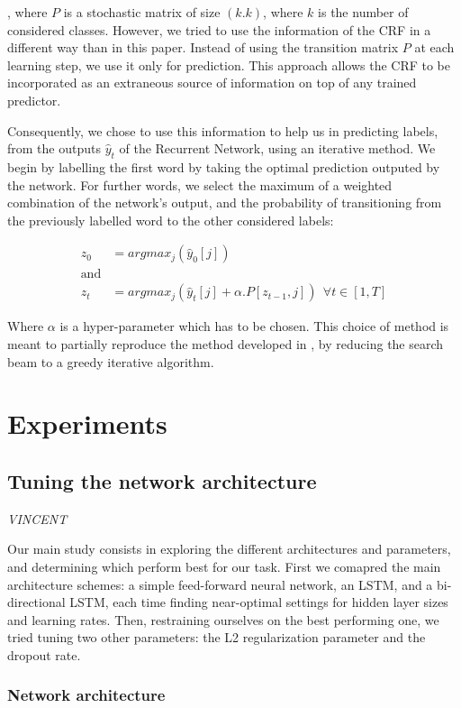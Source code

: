 \documentclass{article} %
\begin{document}
, where $P$ is a stochastic matrix of size $(k.k)$, where $k$ is the number of considered classes. However, we tried to use the information of the CRF in a different way than in this paper. Instead of using the transition matrix $P$ at each learning step, we use it only for prediction. This approach allows the CRF to be incorporated as an extraneous source of information on top of any trained predictor.

Consequently, we chose to use this information to help us in predicting labels, from the outputs $\hat{y}_t$ of the Recurrent Network, using an iterative method. We begin by labelling the first word by taking the optimal prediction outputed by the network. For further words, we select the maximum of a weighted combination of the network's output, and the probability of transitioning from the previously labelled word to the other considered labels:

\begin{align*}
z_0 &= argmax_j(\hat{y}_0[j])
\\
\text{and}&
\\
z_t &= argmax_j(\hat{y}_t[j] + \alpha.P[z_{t-1},  j]) \ \ \forall t \in [1, T]
\end{align*}


Where $\alpha$ is a hyper-parameter which has to be chosen. This
choice of method is meant to partially reproduce the method developed in \cite{lample2016neural}, by reducing the search beam to a greedy iterative algorithm.


\section{Experiments}

\subsection{Tuning the network architecture}
\textit{VINCENT}

Our main study consists in exploring the different architectures and parameters, and determining which perform best for our task. First we comapred the main architecture schemes: a simple feed-forward neural network, an LSTM, and a bi-directional LSTM, each time finding near-optimal settings for hidden layer sizes and learning rates. Then, restraining ourselves on the best performing one, we tried tuning two other parameters: the L2 regularization parameter and the dropout rate.

\subsubsection{Network architecture}
\end{document}
